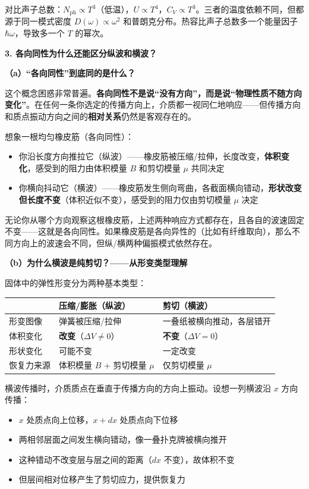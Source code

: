 \begin{insightbox}[物理图像与概念深化]
对比声子总数：$N_{\text{ph}}\propto T^3$（低温），$U\propto T^4$，$C_V\propto T^3$。三者的温度依赖不同，但都源于同一模式密度 $D(\omega)\propto\omega^2$ 和普朗克分布。热容比声子总数多一个能量因子 $\hbar\omega$，导致多一个 $T$ 的幂次。

\textbf{3. 各向同性为什么还能区分纵波和横波？}

\textbf{（a）``各向同性''到底同的是什么？}

这个概念困惑非常普遍。\textbf{各向同性不是说``没有方向''，而是说``物理性质不随方向变化''}。在任何一条你选定的传播方向上，介质都一视同仁地响应——但传播方向和质点振动方向之间的\textbf{相对关系}仍然是客观存在的。

想象一根均匀橡皮筋（各向同性）：
\begin{itemize}
    \item 你沿长度方向推拉它（纵波）——橡皮筋被压缩/拉伸，长度改变，\textbf{体积变化}，感受到的阻力由体积模量 $B$ 和剪切模量 $\mu$ 共同决定
    \item 你横向抖动它（横波）——橡皮筋发生侧向弯曲，各截面横向错动，\textbf{形状改变但长度不变}（体积近似不变），感受到的阻力仅由剪切模量 $\mu$ 决定
\end{itemize}

无论你从哪个方向观察这根橡皮筋，上述两种响应方式都存在，且各自的波速固定不变——这就是各向同性。如果橡皮筋是各向异性的（比如有纤维取向），那么不同方向上的波速会不同，但纵/横两种偏振模式依然存在。

\textbf{（b）为什么横波是纯剪切？——从形变类型理解}

固体中的弹性形变分为两种基本类型：

\begin{center}
\begin{tabular}{p{3cm}p{5cm}p{5cm}}
\toprule
 & \textbf{压缩/膨胀}（纵波） & \textbf{剪切}（横波） \\
\midrule
形变图像 & 弹簧被压缩/拉伸 & 一叠纸被横向推动，各层错开 \\
体积变化 & \textbf{改变}（$\Delta V\neq0$） & \textbf{不变}（$\Delta V=0$） \\
形状变化 & 可能不变 & 一定改变 \\
恢复力来源 & 体积模量 $B$ + 剪切模量 $\mu$ & 仅剪切模量 $\mu$ \\
\bottomrule
\end{tabular}
\end{center}

横波传播时，介质质点在垂直于传播方向的方向上振动。设想一列横波沿 $x$ 方向传播：
\begin{itemize}
    \item $x$ 处质点向上位移，$x+dx$ 处质点向下位移
    \item 两相邻层面之间发生横向错动，像一叠扑克牌被横向推开
    \item 这种错动不改变层与层之间的距离（$dx$ 不变），故体积不变
    \item 但层间相对位移产生了剪切应力，提供恢复力
\end{itemize}


\end{insightbox}
